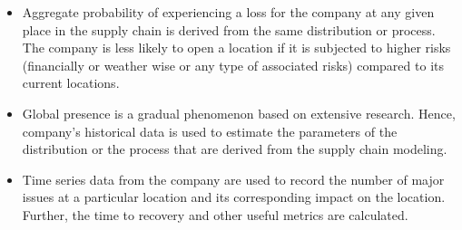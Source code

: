 \documentclass[conference]{IEEEtran}
\begin{document}
\begin{itemize}
\item  Aggregate probability of experiencing a loss for the company at any given place in the supply chain is derived from the same distribution or process. The company is less likely to open a location if it is subjected to higher risks (financially or weather wise or any type of associated risks) compared to its current locations.
\item  Global presence is a gradual phenomenon based on extensive research. Hence, company’s historical data is used to estimate the parameters of the distribution or the process that are derived from the supply chain modeling.
\item Time series data from the company are used to record the number of major issues at a particular location and its corresponding impact on the location. Further, the time to recovery and other useful metrics are calculated.
\end{itemize}
\end{document}

